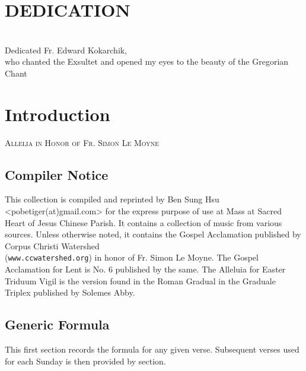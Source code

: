\documentclass[11pt]{book} %
\begin{document}

\chapter{DEDICATION}
\begin{paragraph}\\
Dedicated Fr. Edward Kokarchik,\\
who chanted the Exsultet and opened my eyes to the beauty of the Gregorian Chant
\end{paragraph}


\tableofcontents
\clearpage

\mainmatter

\chapter{Introduction}
\clearpage
\begin{center}\begin{huge}
\textsc{Allelia in Honor of Fr. Simon Le Moyne}
\end{huge}\end{center}

\section{Compiler Notice}
\begin{paragraph}
This collection is compiled and reprinted by Ben Sung Hsu
<pobetiger(at)gmail.com> for the express purpose of use at 
Mass at Sacred Heart of Jesus Chinese Parish. It contains a collection
of music from various sources. Unless otherwise noted, it contains
the Gospel Acclamation published by Corpus Christi Watershed \\
(\texttt{www.ccwatershed.org}) in honor of Fr. Simon Le Moyne. 
The Gospel Acclamation for Lent is No. 6 published by the same.
The Alleluia for Easter Triduum Vigil is the version found in the
Roman Gradual in the Graduale Triplex published by Solemes Abby.
\end{paragraph}

\section{Generic Formula}

\begin{paragraph}
This first section records the formula for any given verse. 
Subsequent verses used for each Sunday is then provided by section.
\end{paragraph}
\end{document}
